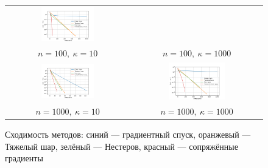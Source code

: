 \documentclass[a4paper]{article}
\begin{document}
\begin{figure}[H]
\begin{tabular}{cc}
    \includegraphics[width=0.45\textwidth]{images/task1_100_1000.png} \\[1ex]
    \(n=100,\ \kappa=10\) & \(n=100,\ \kappa=1000\) \\[2ex]
    \includegraphics[width=0.45\textwidth]{images/task1_1000_10.png} &
    \includegraphics[width=0.45\textwidth]{images/task1_1000_1000.png} \\[1ex]
    \(n=1000,\ \kappa=10\) & \(n=1000,\ \kappa=1000\)
  \end{tabular}
  \caption{Сходимость методов: синий — градиентный спуск, оранжевый — Тяжелый шар, зелёный — Нестеров, красный — сопряжённые градиенты}
  \label{fig:quad_results}
\end{figure}
\end{document}
